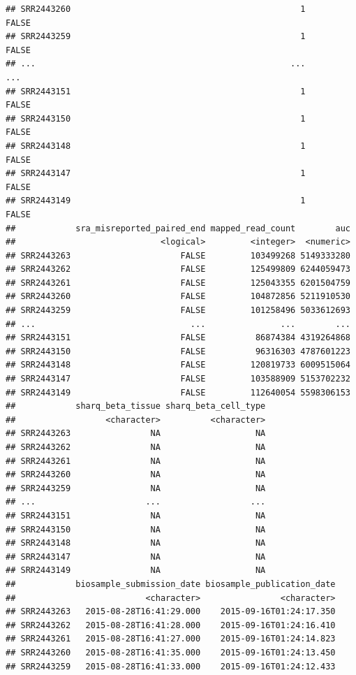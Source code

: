 \documentclass[9pt,a4paper,]{extarticle}
\begin{document}
\begin{verbatim}
## SRR2443260                                              1      FALSE
## SRR2443259                                              1      FALSE
## ...                                                   ...        ...
## SRR2443151                                              1      FALSE
## SRR2443150                                              1      FALSE
## SRR2443148                                              1      FALSE
## SRR2443147                                              1      FALSE
## SRR2443149                                              1      FALSE
##            sra_misreported_paired_end mapped_read_count        auc
##                             <logical>         <integer>  <numeric>
## SRR2443263                      FALSE         103499268 5149333280
## SRR2443262                      FALSE         125499809 6244059473
## SRR2443261                      FALSE         125043355 6201504759
## SRR2443260                      FALSE         104872856 5211910530
## SRR2443259                      FALSE         101258496 5033612693
## ...                               ...               ...        ...
## SRR2443151                      FALSE          86874384 4319264868
## SRR2443150                      FALSE          96316303 4787601223
## SRR2443148                      FALSE         120819733 6009515064
## SRR2443147                      FALSE         103588909 5153702232
## SRR2443149                      FALSE         112640054 5598306153
##            sharq_beta_tissue sharq_beta_cell_type
##                  <character>          <character>
## SRR2443263                NA                   NA
## SRR2443262                NA                   NA
## SRR2443261                NA                   NA
## SRR2443260                NA                   NA
## SRR2443259                NA                   NA
## ...                      ...                  ...
## SRR2443151                NA                   NA
## SRR2443150                NA                   NA
## SRR2443148                NA                   NA
## SRR2443147                NA                   NA
## SRR2443149                NA                   NA
##            biosample_submission_date biosample_publication_date
##                          <character>                <character>
## SRR2443263   2015-08-28T16:41:29.000    2015-09-16T01:24:17.350
## SRR2443262   2015-08-28T16:41:28.000    2015-09-16T01:24:16.410
## SRR2443261   2015-08-28T16:41:27.000    2015-09-16T01:24:14.823
## SRR2443260   2015-08-28T16:41:35.000    2015-09-16T01:24:13.450
## SRR2443259   2015-08-28T16:41:33.000    2015-09-16T01:24:12.433

\end{verbatim}
\end{document}
